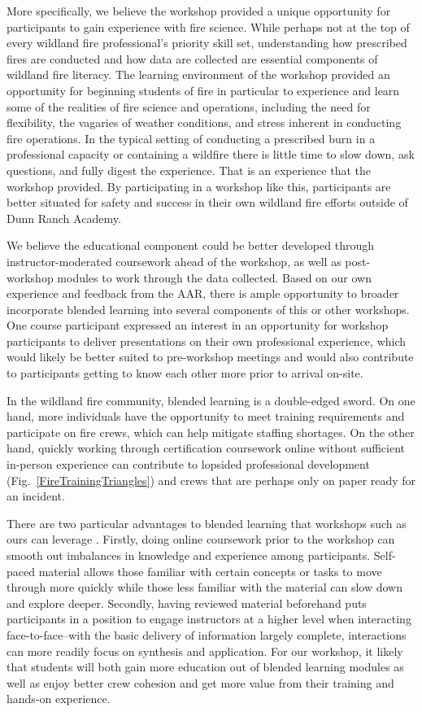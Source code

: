 \documentclass[fire,article,submit,moreauthors,pdftex]{Definitions/mdpi}
\begin{document}
More specifically, we believe the workshop provided a unique opportunity for participants to gain experience with fire science.
While perhaps not at the top of every wildland fire professional's priority skill set, understanding how prescribed fires are conducted and how data are collected are essential components of wildland fire literacy.
The learning environment of the workshop provided an opportunity for beginning students of fire in particular to experience and learn some of the realities of fire science and operations, including the need for flexibility, the vagaries of weather conditions, and stress inherent in conducting fire operations.
In the typical setting of conducting a prescribed burn in a professional capacity or containing a wildfire there is little time to slow down, ask questions, and fully digest the experience.
That is an experience that the workshop provided.
By participating in a workshop like this, participants are better situated for safety and success in their own wildland fire efforts outside of Dunn Ranch Academy.

We believe the educational component could be better developed through instructor-moderated coursework ahead of the workshop, as well as post-workshop modules to work through the data collected.
Based on our own experience and feedback from the AAR, there is ample opportunity to broader incorporate blended learning into several components of this or other workshops.
One course participant expressed an interest in an opportunity for workshop participants to deliver presentations on their own professional experience, which would likely be better suited to pre-workshop meetings and would also contribute to participants getting to know each other more prior to arrival on-site.

In the wildland fire community, blended learning is a double-edged sword.
On one hand, more individuals have the opportunity to meet training requirements and participate on fire crews, which can help mitigate staffing shortages.
On the other hand, quickly working through certification coursework online without sufficient in-person experience can contribute to lopsided professional development (Fig.~\ref{FireTrainingTriangles}) and crews that are perhaps only on paper ready for an incident.

There are two particular advantages to blended learning that workshops such as ours can leverage \citep{cantrell2014}.
Firstly, doing online coursework prior to the workshop can smooth out imbalances in knowledge and experience among participants.
Self-paced material allows those familiar with certain concepts or tasks to move through more quickly while those less familiar with the material can slow down and explore deeper. Secondly, having reviewed material beforehand puts participants in a position to engage instructors at a higher level when interacting face-to-face--with the basic delivery of information largely complete, interactions can more readily focus on synthesis and application.
For our workshop, it likely that students will both gain more education out of blended learning modules as well as enjoy better crew cohesion and get more value from their training and hands-on experience.
\end{document}
